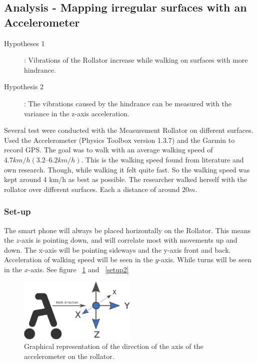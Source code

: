 \subsection{Analysis - Mapping irregular surfaces with an Accelerometer}
\begin{description}
\item[Hypotheses 1] : Vibrations of the Rollator increase while walking on surfaces with more hindrance. 
\item[Hypothesis 2] : The vibrations caused by the hindrance can be measured with the variance in the z-axis acceleration. 
\end{description}

Several test were conducted with the Measurement Rollator on different surfaces. Used the Accelerometer (Physics Toolbox version 1.3.7) and the Garmin to record GPS. The goal was to walk with an average walking speed of $4.7 km/h (3.2 – 6.2 km/h)$. This is the walking speed found from literature and own research. Though, while walking it felt quite fast. So the walking speed was kept around 4 km/h as best as possible. The researcher walked herself with the rollator over different surfaces. Each a distance of around $20m$. 

\subsubsection{Set-up}
The smart phone will always be placed horizontally on the Rollator. This means the $z$-axis is pointing down, and will correlate most with movements up and down. The x-axis will be pointing sideways and the y-axis front and back. Acceleration of walking speed will be seen in the $y$-axis. While turns will be seen in the $x$-axis. See figure ~\ref{setup} and ~\ref{setup2}

\begin{figure}[h]
\includegraphics[width=0.5\textwidth]{img/M_rollator_setup.pdf}
\centering
\caption{ Graphical representation of the direction of the axis of the accelerometer on the rollator. \label{setup}}
\end{figure}

